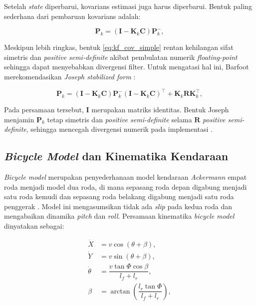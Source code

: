 Setelah \emph{state} diperbarui, kovarians estimasi juga harus diperbarui. Bentuk paling sederhana dari pembaruan kovarians adalah:

\begin{equation}
  \mathbf{P}_k = (\mathbf{I} - \mathbf{K}_k \mathbf{C}) \mathbf{P}_k^-,
  \label{eq:kf_cov_simple}
\end{equation}

Meskipun lebih ringkas, bentuk \eqref{eq:kf_cov_simple} rentan kehilangan sifat simetris dan \emph{positive semi-definite} akibat pembulatan numerik \emph{floating-point} sehingga dapat menyebabkan divergensi filter. Untuk mengatasi hal ini, Barfoot merekomendasikan \emph{Joseph stabilized form} \parencite{Barfoot2017}:

\begin{equation}
  \mathbf{P}_k = (\mathbf{I} - \mathbf{K}_k \mathbf{C}) \mathbf{P}_k^- (\mathbf{I} - \mathbf{K}_k \mathbf{C})^\top + \mathbf{K}_k \mathbf{R} \mathbf{K}_k^\top,
  \label{eq:kf_cov_update}
\end{equation}

Pada persamaan tersebut, $\mathbf{I}$ merupakan matriks identitas. Bentuk Joseph menjamin $\mathbf{P}_k$ tetap simetris dan \emph{positive semi-definite} selama $\mathbf{R}$ \emph{positive semi-definite}, sehingga mencegah divergensi numerik pada implementasi \parencite{Barfoot2017}.

\subsection{\emph{Bicycle Model} dan Kinematika Kendaraan}
\label{subsec:bicycle-model}

\emph{Bicycle model} merupakan penyederhanaan model kendaraan \emph{Ackermann} empat roda menjadi model dua roda, di mana sepasang roda depan digabung menjadi satu roda kemudi dan sepasang roda belakang digabung menjadi satu roda penggerak \parencite{BouGhosn2024ITSC}. Model ini mengasumsikan tidak ada \emph{slip} pada kedua roda dan mengabaikan dinamika \emph{pitch} dan \emph{roll}. Persamaan kinematika \emph{bicycle model} dinyatakan sebagai:

\begin{equation}
  \begin{aligned}
    \dot{X} &= v \cos(\theta + \beta), \\
    \dot{Y} &= v \sin(\theta + \beta), \\
    \dot{\theta} &= \dfrac{v \tan \Phi \cos \beta}{l_f + l_r}, \\
    \beta &= \arctan\left(\dfrac{l_r \tan \Phi}{l_f + l_r}\right),
  \end{aligned}
  \label{eq:bicycle_kinematic}
\end{equation}

